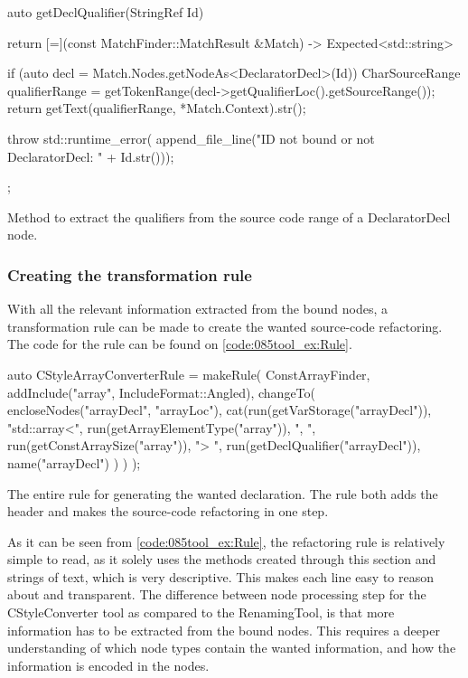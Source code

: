 \begin{listing}[H]
    \begin{cppcode}
auto getDeclQualifier(StringRef Id) {
    return [=](const MatchFinder::MatchResult &Match) -> Expected<std::string> {
        if (auto decl = Match.Nodes.getNodeAs<DeclaratorDecl>(Id)) {
            CharSourceRange qualifierRange = getTokenRange(decl->getQualifierLoc().getSourceRange());
            return getText(qualifierRange, *Match.Context).str();
        }

        throw std::runtime_error(
			    append_file_line("ID not bound or not DeclaratorDecl: " + Id.str()));
    };
}
    \end{cppcode}
    \caption{Method to extract the qualifiers from the source code range of a DeclaratorDecl node.}
    \label{code:085tool_ex:DeclaratorQualif}
\end{listing}

\subsubsection*{Creating the transformation rule}

With all the relevant information extracted from the bound nodes, a transformation rule can be made to create the wanted source-code refactoring. The code for the rule can be found on \cref{code:085tool_ex:Rule}.

\begin{listing}[H]
    \begin{cppcode}
auto CStyleArrayConverterRule = makeRule(
    ConstArrayFinder,
    {
        addInclude("array", IncludeFormat::Angled),
        changeTo(
            encloseNodes("arrayDecl", "arrayLoc"),
            cat(run(getVarStorage("arrayDecl")),
                "std::array<",
                run(getArrayElementType("array")),
                ", ",
                run(getConstArraySize("array")),
                "> ",
                run(getDeclQualifier("arrayDecl")),
                name("arrayDecl")
            )
        )
    });
    \end{cppcode}
    \caption{The entire rule for generating the wanted  declaration. The rule both adds the  header and makes the source-code refactoring in one step.}
    \label{code:085tool_ex:Rule}
\end{listing}

As it can be seen from \cref{code:085tool_ex:Rule}, the refactoring rule is relatively simple to read, as it solely uses the methods created through this section and strings of text, which is very descriptive. This makes each line easy to reason about and transparent. The difference between node processing step for the CStyleConverter tool as compared to the RenamingTool, is that more information has to be extracted from the bound nodes. This requires a deeper understanding of which node types contain the wanted information, and how the information is encoded in the nodes.

